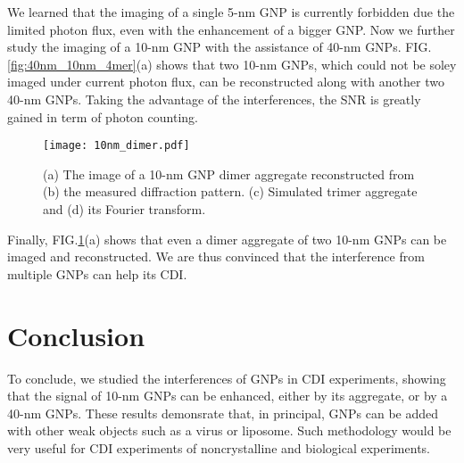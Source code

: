\documentclass[aps,prb,reprint,groupedaddress, superscriptaddress]{revtex4-1}
\begin{document}
We learned that the imaging of a single 5-nm GNP is currently forbidden due the limited photon flux, even with the enhancement of a bigger GNP. Now we further study the imaging of a 10-nm GNP with the assistance of 40-nm GNPs. FIG.\ref{fig:40nm_10nm_4mer}(a) shows that two 10-nm GNPs, which could not be soley imaged under current photon flux, can be reconstructed along with another two 40-nm GNPs. 
Taking the advantage of the interferences, the SNR is greatly gained in term of photon counting.

\begin{figure}
	\texttt{[image: 10nm\_dimer.pdf]}%
	\caption{(a) The image of a 10-nm GNP dimer aggregate reconstructed from (b) the measured diffraction pattern. (c) Simulated trimer aggregate and (d) its Fourier transform.}
	\label{fig:10nm_dimer}
\end{figure}

Finally, FIG.\ref{fig:10nm_dimer}(a) shows that even a dimer aggregate of two 10-nm GNPs can be imaged and reconstructed.
We are thus convinced that the interference from multiple GNPs can help its CDI.

\section{Conclusion}

To conclude, we studied the interferences of GNPs in CDI experiments, showing that the signal of 10-nm GNPs can be enhanced, either by its aggregate, or by a 40-nm GNPs. 
These results demonsrate that, in principal, GNPs can be added with other weak objects such as a virus or liposome.
Such methodology would be very useful for CDI experiments of noncrystalline and biological experiments.

\end{document}
